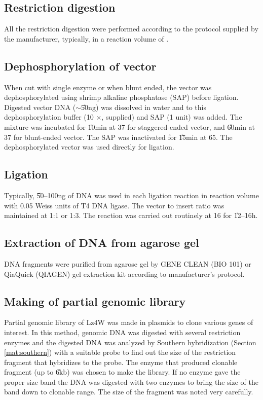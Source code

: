 \subsection{Restriction digestion}

All the restriction digestion were performed according to the
protocol supplied by the manufacturer, typically, in a reaction
volume of .

\subsection{Dephosphorylation of vector}
\label{dephos} When cut with single enzyme or when blunt ended,
the vector was dephosphorylated  using shrimp alkaline phosphatase
(SAP) before ligation. Digested vector DNA ($\sim$\U{50}{ng}) was
dissolved in  water and to this  dephosphorylation
buffer (10 $\times$, supplied) and  SAP (1 unit) was added.
The mixture was incubated for \U{10}{min} at 37\dg{} for
staggered-ended vector, and \U{60}{min} at 37\dg{} for blunt-ended
vector. The SAP was inactivated for \U{15}{min} at 65\dg{}. The
dephosphorylated vector was used directly for ligation.

\subsection{Ligation}

Typically, \U{50--100}{ng} of DNA was used in each ligation
reaction in  reaction volume with 0.05 Weiss units of
T4 DNA ligase. The vector to insert ratio was maintained at 1:1 or
1:3. The reaction was carried out routinely at 16\dg{} for
\U{12--16}{h}.

\subsection{Extraction of DNA from agarose gel}
\label{mat:gel-extract}

DNA fragments were purified from agarose gel by GENE
CLEAN{\scriptsize\texttrademark} (BIO 101) or
QiaQuick{\scriptsize\texttrademark} (QIAGEN) gel extraction kit
according to manufacturer's protocol.

\subsection{Making of partial genomic library}

Partial genomic library of Lz4W was made in plasmids to clone
various genes of interest. In this method, genomic DNA was
digested with several restriction enzymes and the digested DNA was
analyzed by Southern hybridization (Section \ref{mat:southern})
with a suitable probe to find out the size of the restriction
fragment that hybridizes to the probe. The enzyme that produced
clonable fragment (up to \U{6}{kb}) was chosen to make the
library. If no enzyme gave the proper size band the DNA was
digested with two enzymes to bring the size of the band down to
clonable range. The size of the fragment was noted very carefully.

